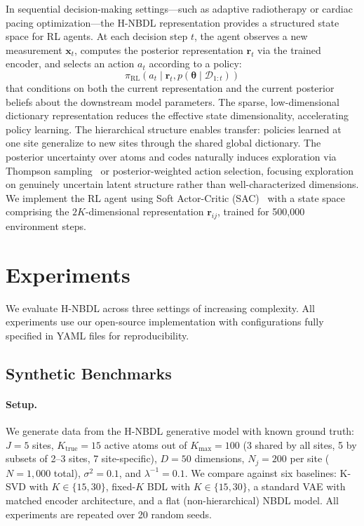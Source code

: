 \documentclass[11pt,a4paper]{article}
\theoremstyle{definition}
\begin{document}
In sequential decision-making settings---such as adaptive radiotherapy or cardiac pacing optimization---the H-NBDL representation provides a structured state space for RL agents. At each decision step $t$, the agent observes a new measurement $\mathbf{x}_t$, computes the posterior representation $\mathbf{r}_t$ via the trained encoder, and selects an action $a_t$ according to a policy:
\begin{equation}
  \pi_{\mathrm{RL}}(a_t \mid \mathbf{r}_t, p(\boldsymbol{\theta} \mid \mathcal{D}_{1:t})) \label{eq:rl}
\end{equation}
that conditions on both the current representation and the current posterior beliefs about the downstream model parameters. The sparse, low-dimensional dictionary representation reduces the effective state dimensionality, accelerating policy learning. The hierarchical structure enables transfer: policies learned at one site generalize to new sites through the shared global dictionary. The posterior uncertainty over atoms and codes naturally induces exploration via Thompson sampling~\citep{thompson1933} or posterior-weighted action selection, focusing exploration on genuinely uncertain latent structure rather than well-characterized dimensions. We implement the RL agent using Soft Actor-Critic (SAC)~\citep{sutton2018} with a state space comprising the $2K$-dimensional representation $\mathbf{r}_{ij}$, trained for 500,000 environment steps.

\section{Experiments}\label{sec:experiments}

We evaluate H-NBDL across three settings of increasing complexity. All experiments use our open-source implementation with configurations fully specified in YAML files for reproducibility.

\subsection{Synthetic Benchmarks}

\paragraph{Setup.} We generate data from the H-NBDL generative model with known ground truth: $J{=}5$ sites, $K_{\mathrm{true}}{=}15$ active atoms out of $K_{\max}{=}100$ (3 shared by all sites, 5 by subsets of 2--3 sites, 7 site-specific), $D{=}50$ dimensions, $N_j{=}200$ per site ($N{=}1{,}000$ total), $\sigma^2{=}0.1$, and $\lambda^{-1}{=}0.1$. We compare against six baselines: K-SVD with $K \in \{15, 30\}$, fixed-$K$ BDL with $K \in \{15, 30\}$, a standard VAE with matched encoder architecture, and a flat (non-hierarchical) NBDL model. All experiments are repeated over 20 random seeds.
\end{document}
